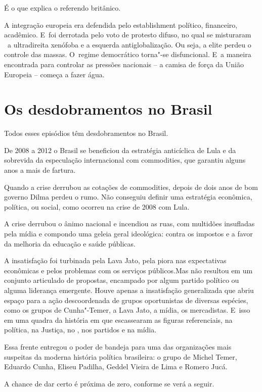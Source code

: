 É o que explica o referendo britânico.

A integração europeia era defendida pelo establishment político,
financeiro, acadêmico. E~foi derrotada pelo voto de protesto difuso, no
qual se misturaram ~a ultradireita xenófoba e a esquerda
antiglobalização. Ou seja, a elite perdeu o controle das massas. O~regime democrático torna"-se disfuncional. E~a maneira encontrada para
controlar as pressões nacionais -- a camisa de força da União Europeia
-- começa a fazer água.

\section{Os desdobramentos no Brasil}

Todos esses episódios têm desdobramentos no Brasil.

De 2008 a 2012 o Brasil se beneficiou da estratégia anticíclica de Lula
e da sobrevida da especulação internacional com commodities, que
garantiu alguns anos a mais de fartura.

Quando a crise derrubou as cotações de commodities, depois de dois anos
de bom governo Dilma perdeu o rumo. Não conseguiu definir uma estratégia
econômica, política, ou social, como ocorreu na crise de 2008 com Lula.

A crise derrubou o ânimo nacional e incendiou as ruas, com multidões
insufladas pela mídia e compondo uma geleia geral ideológica: contra os
impostos e a favor da melhoria da educação e saúde públicas.

A insatisfação foi turbinada pela Lava Jato, pela piora nas expectativas
econômicas e pelos problemas com os serviços públicos.Mas não resultou
em um conjunto articulado de propostas, encampado por algum partido
político ou alguma liderança emergente. Houve apenas a insatisfação
generalizada que abriu espaço para a ação descoordenada de grupos
oportunistas de diversas espécies, como os grupos de Cunha"-Temer, a Lava
Jato, a mídia, os mercadistas. E~isso em uma quadra da história em que
escassearam as figuras referenciais, na política, na Justiça, no ,
nos partidos e na mídia.

Essa frente entregou o poder de bandeja para uma das organizações mais
suspeitas da moderna história política brasileira: o grupo de Michel
Temer, Eduardo Cunha, Eliseu Padilha, Geddel Vieira de Lima e Romero
Jucá.

A chance de dar certo é próxima de zero, conforme se verá a seguir.

